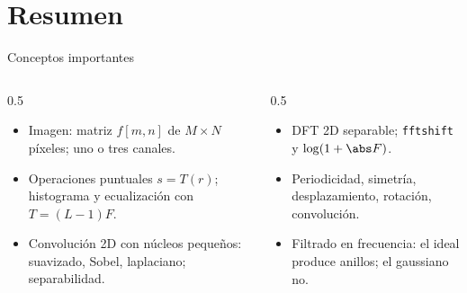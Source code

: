 \documentclass[aspectratio=169,11pt]{beamer}
\begin{document}
\section*{Resumen}
\begin{frame}{Conceptos importantes}
  \begin{columns}[T]
    \begin{column}{0.5\textwidth}
      \begin{itemize}
        \item Imagen: matriz $f[m,n]$ de $M\times N$ píxeles; uno o tres canales.
        \item Operaciones puntuales $s=T(r)$; histograma y ecualización con $T=(L-1)F$.
        \item Convolución 2D con núcleos pequeños: suavizado, Sobel, laplaciano; separabilidad.
      \end{itemize}
    \end{column}
    \begin{column}{0.5\textwidth}
      \begin{itemize}
        \item DFT 2D separable; \texttt{fftshift} y $\log(1+\abs F)$.
        \item Periodicidad, simetría, desplazamiento, rotación, convolución.
        \item Filtrado en frecuencia: el ideal produce anillos; el gaussiano no.
      \end{itemize}
    \end{column}
  \end{columns}
  \bigskip
\end{frame}
\end{document}
